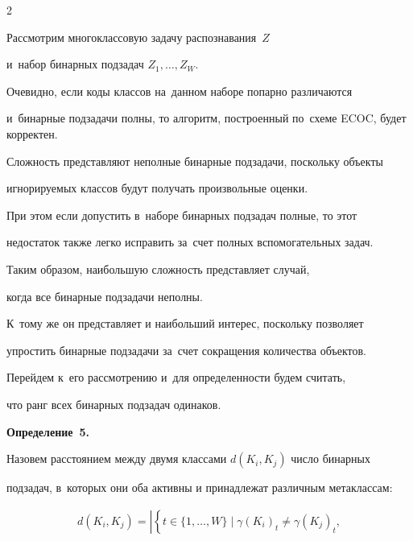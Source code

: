 \begin{multicols}{2}
\smallskip





Рассмотрим многоклассовую задачу распознавания~$Z$


 и~набор бинарных подзадач $Z_1,\ldots,Z_W$.


Очевидно, если коды классов на~данном наборе попарно различаются 


и~бинарные подзадачи полны, то алгоритм, построенный по~схеме ECOC, будет корректен.





Сложность представляют неполные бинарные подзадачи, поскольку объекты 


игнорируемых классов будут получать произвольные оценки.


При этом если допустить в~наборе бинарных подзадач полные, то этот 


недостаток также легко исправить за~счет полных вспомогательных задач.





Таким образом, наибольшую сложность представляет случай, 


когда все бинарные подзадачи неполны.


К~тому же он представляет и наибольший интерес, поскольку позволяет 


упростить бинарные подзадачи за~счет сокращения количества объектов.


Перейдем к~его рассмотрению и~для опре\-де\-лен\-ности будем считать, 


что ранг всех бинарных подзадач одинаков.





\smallskip





\noindent


\textbf{Определение~5.}\


Назовем расстоянием между двумя классами $d(K_i, K_j)$ число бинарных 


подзадач, в~которых они оба активны и принадлежат различным метаклассам:


\begin{multline*}


d(K_i, K_j) = \left| \left\{ t\in\{1,\ldots,W\} \;|\; 


\gamma(K_i)_t\neq\gamma(K_j)_t,\right.\right.\\



\end{multline*}
\end{multicols}
